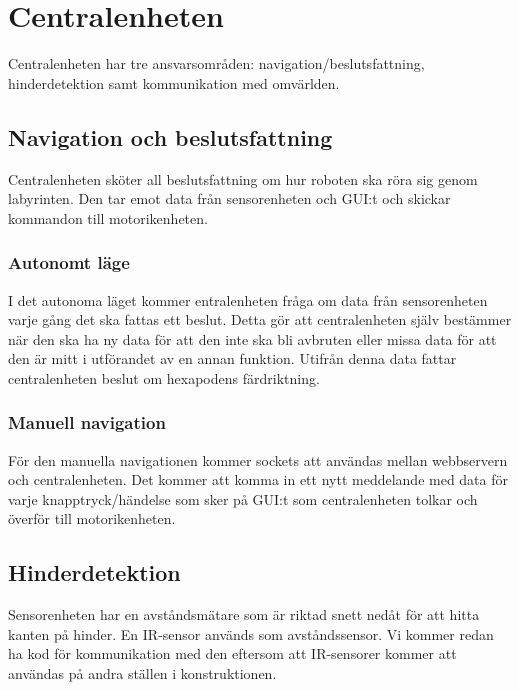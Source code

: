 \documentclass[a4paper,titlepage,12pt]{article}
\begin{document}
	\section{Centralenheten}
	Centralenheten har tre ansvarsområden: navigation/beslutsfattning, hinderdetektion samt
	kommunikation med omvärlden.

	\subsection{Navigation och beslutsfattning}

	Centralenheten sköter all beslutsfattning om hur roboten ska röra sig
	genom labyrinten. Den tar emot data från sensorenheten och GUI:t och
	skickar kommandon till motorikenheten.
  
	\subsubsection{Autonomt läge}
	I det autonoma läget kommer entralenheten fråga om data från sensorenheten
    varje gång det ska fattas ett beslut. Detta gör att centralenheten själv
    bestämmer när den ska ha ny data för att den inte ska bli avbruten eller missa
    data för att den är mitt i utförandet av en annan funktion. Utifrån denna data
    fattar centralenheten beslut om hexapodens färdriktning.

    \subsubsection{Manuell navigation}
    För den manuella navigationen kommer sockets att användas mellan webbservern
    och centralenheten. Det kommer att komma in ett nytt meddelande med data för varje
    knapptryck/händelse som sker på GUI:t som centralenheten tolkar och överför
    till motorikenheten. 

	\subsection{Hinderdetektion}
	Sensorenheten har en avståndsmätare som är riktad snett nedåt för att hitta kanten 
	på hinder. En IR-sensor används som avståndssensor. Vi kommer redan ha  kod för kommunikation med
	den  eftersom att IR-sensorer kommer att användas på andra ställen i konstruktionen. 
	
\end{document}

